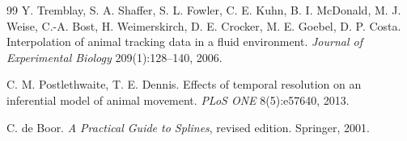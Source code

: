 \begin{thebibliography}{99}
 Y. Tremblay, S. A. Shaffer, S. L. Fowler, C. E. Kuhn, B. I. McDonald,
M. J. Weise, C.-A. Bost, H. Weimerskirch, D. E. Crocker, M. E. Goebel, D. P. Costa. Interpolation
of animal tracking data in a fluid environment. \emph{Journal of Experimental Biology}
209(1):128--140, 2006.

 C. M. Postlethwaite, T. E. Dennis. Effects of temporal resolution on an
inferential model of animal movement. \emph{PLoS ONE} 8(5):e57640, 2013.

 C. de Boor. \emph{A Practical Guide to Splines}, revised edition. Springer,
2001.

\end{thebibliography}
